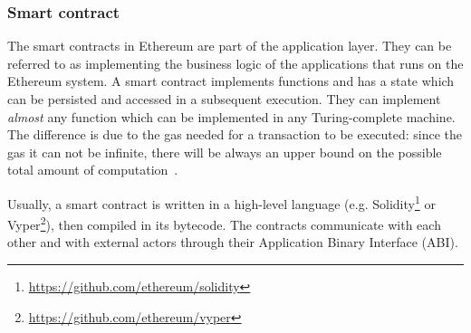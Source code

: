 \subsubsection{Smart contract}
\label{sec:smart-contract}

The smart contracts in Ethereum are part of the application layer. They can be
referred to as implementing the business logic of the applications that runs on
the Ethereum system. A smart contract implements functions and has a state which
can be persisted and accessed in a subsequent execution. They can implement
\emph{almost} any function which can be implemented in any Turing-complete
machine. The difference is due to the gas needed for a transaction to be
executed: since the gas it can not be infinite, there will be always an upper
bound on the possible total amount of computation~\cite{wood2018ethereum}.

Usually, a smart contract is written in a high-level language (e.g.
Solidity\footnote{\url{https://github.com/ethereum/solidity}} or
Vyper\footnote{\url{https://github.com/ethereum/vyper}}), then compiled in its
bytecode. The contracts communicate with each other and with external actors
through their Application Binary Interface (ABI).

